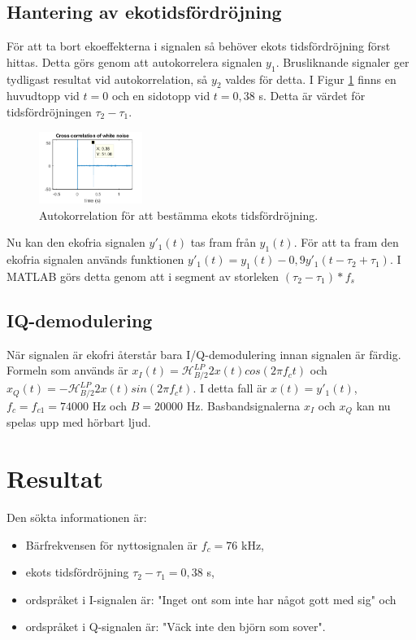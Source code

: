 \documentclass[10pt,twocolumn]{article}
\begin{document}
\subsection{Hantering av ekotidsfördröjning}

För att ta bort ekoeffekterna i signalen så behöver ekots tidsfördröjning först hittas. Detta görs genom att autokorrelera signalen $y_1$. Brusliknande signaler ger tydligast resultat vid autokorrelation, så $y_2$ valdes för detta. I Figur \ref{echo} finns en huvudtopp vid $t=0$ och en sidotopp vid $t=0,38$ s. Detta är värdet för tidsfördröjningen $\tau_2 - \tau_1$.


\begin{figure}[H]
	\centering
	\includegraphics[width=0.3\textwidth]{figures/Figure3.png}
	\caption{Autokorrelation för att bestämma ekots tidsfördröjning.}
	\label{echo}
\end{figure}

Nu kan den ekofria signalen $y'_1(t)$ tas fram från $y_1(t)$. För att ta fram den ekofria signalen används funktionen $y'_1(t)=y_1(t) - 0,9y'_1(t-\tau_2 + \tau_1)$. I MATLAB görs detta genom att i segment av storleken $(\tau_2 - \tau_1) * f_s$

\subsection{IQ-demodulering}

När signalen är ekofri återstår bara I/Q-demodulering innan signalen är färdig. Formeln som används är $x_I(t)=\mathcal{H}^{LP}_{B/2}{2x(t)cos(2\pi f_c t)}$ och $x_Q(t)=-\mathcal{H}^{LP}_{B/2}{2x(t)sin(2\pi f_c t)}$. I detta fall är $x(t)=y'_1(t)$, $f_c = f_{c1} = 74000$ Hz och $B=20000$ Hz. Basbandsignalerna $x_I$ och $x_Q$ kan nu spelas upp med hörbart ljud.

\section{Resultat}

Den sökta informationen är:
\begin{itemize}
\item Bärfrekvensen för nyttosignalen är $f_c=76$ kHz,
\item ekots tidsfördröjning $\tau_2 - \tau_1 = 0,38$ s, 
\item ordspråket i I-signalen är: "Inget ont som inte har något gott med sig" och
\item ordspråket i Q-signalen är: "Väck inte den björn som sover".
\end{itemize}
\end{document}
